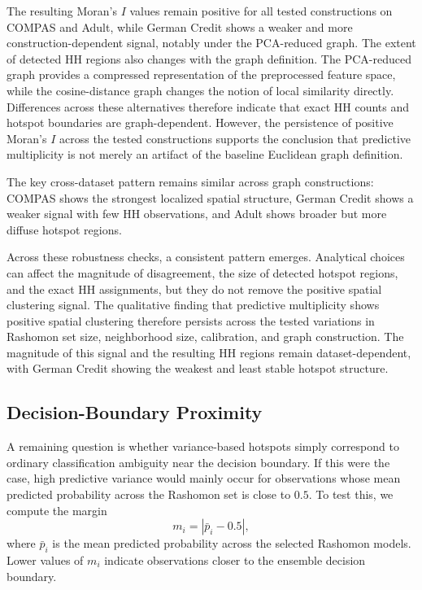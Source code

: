 \begin{table}[htbp]
\centering
\caption{Spatial metrics under alternative kNN graph constructions (mean $\pm$ standard deviation
over 10 seeds; dataset-specific default $k$: 30 for COMPAS and German Credit, 60 for Adult).}
\label{tab:alt_graph}
\small

\end{table}


The resulting Moran's $I$ values remain positive for all tested constructions on COMPAS
and Adult, while German Credit shows a weaker and more construction-dependent signal,
notably under the PCA-reduced graph. The extent of detected HH regions also changes
with the graph definition. The
PCA-reduced graph provides a compressed representation of the preprocessed feature
space, while the cosine-distance graph changes the notion of local similarity directly.
Differences across these alternatives therefore indicate that exact HH counts and hotspot
boundaries are graph-dependent. However, the persistence of positive Moran's $I$ across
the tested constructions supports the conclusion that predictive multiplicity is not merely
an artifact of the baseline Euclidean graph definition.

The key cross-dataset pattern remains similar across graph constructions: COMPAS shows
the strongest localized spatial structure, German Credit shows a weaker signal with few
HH observations, and Adult shows broader but more diffuse hotspot regions.

Across these robustness checks, a consistent pattern emerges. Analytical choices can
affect the magnitude of disagreement, the size of detected hotspot regions, and the
exact HH assignments, but they do not remove the positive spatial clustering signal. The 
qualitative finding that predictive multiplicity shows positive spatial clustering
therefore persists across the tested variations in Rashomon set size, neighborhood size,
calibration, and graph construction. The magnitude of this signal and the resulting HH
regions remain dataset-dependent, with German Credit showing the weakest and least
stable hotspot structure.

\subsection{Decision-Boundary Proximity}
\label{sec:results-boundary-proximity}

A remaining question is whether variance-based hotspots simply correspond to ordinary
classification ambiguity near the decision boundary. If this were the case, high predictive
variance would mainly occur for observations whose mean predicted probability across
the Rashomon set is close to $0.5$. To test this, we compute the margin
\[
m_i = |\bar{p}_i - 0.5|,
\]
where $\bar{p}_i$ is the mean predicted probability across the selected Rashomon models.
Lower values of $m_i$ indicate observations closer to the ensemble decision boundary.

